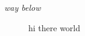 \documentclass[12pt]{article}
\begin{document}
\begin{minipage}[40]{2cm}
\textit{way below}
\end{minipage}

\begin{figure}[t]
	\begin{minipage}{.3\textwidth}
		hi there world
	\end{minipage}
\end{figure}

\newpage
\end{document}
